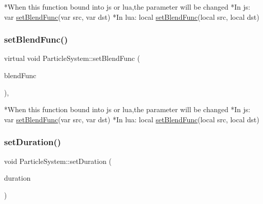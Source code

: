 \begin{DoxyCode}
*When \textcolor{keyword}{this} \textcolor{keyword}{function} bound into js or lua,the parameter will be changed
*In js: var \hyperlink{classParticleSystem_a72e4f69d65e56ad946a672064a75bd9b}{setBlendFunc}(var src, var dst)
*In lua: local \hyperlink{classParticleSystem_a72e4f69d65e56ad946a672064a75bd9b}{setBlendFunc}(local src, local dst)
\end{DoxyCode}
 \mbox{\label{classParticleSystem_abac3b3d6d4bd98bbeb23efa1b339343c}} 
\subsubsection{\texorpdfstring{set\+Blend\+Func()}{setBlendFunc()}\hspace{0.1cm}{\footnotesize\ttfamily [2/2]}}
{\footnotesize\ttfamily virtual void Particle\+System\+::set\+Blend\+Func (\begin{DoxyParamCaption}\item[{const \hyperlink{structBlendFunc}{Blend\+Func} \&}]{blend\+Func }\end{DoxyParamCaption})\hspace{0.3cm}{\ttfamily [override]}, {\ttfamily [virtual]}}


\begin{DoxyCode}
*When \textcolor{keyword}{this} \textcolor{keyword}{function} bound into js or lua,the parameter will be changed
*In js: var \hyperlink{classParticleSystem_a72e4f69d65e56ad946a672064a75bd9b}{setBlendFunc}(var src, var dst)
*In lua: local \hyperlink{classParticleSystem_a72e4f69d65e56ad946a672064a75bd9b}{setBlendFunc}(local src, local dst)
\end{DoxyCode}
 \mbox{\label{classParticleSystem_ab19b5936cb1d031282c0b6019ae4c60d}} 
\subsubsection{\texorpdfstring{set\+Duration()}{setDuration()}\hspace{0.1cm}{\footnotesize\ttfamily [1/2]}}
{\footnotesize\ttfamily void Particle\+System\+::set\+Duration (\begin{DoxyParamCaption}\item[{float}]{duration }\end{DoxyParamCaption})\hspace{0.3cm}{\ttfamily [inline]}}

